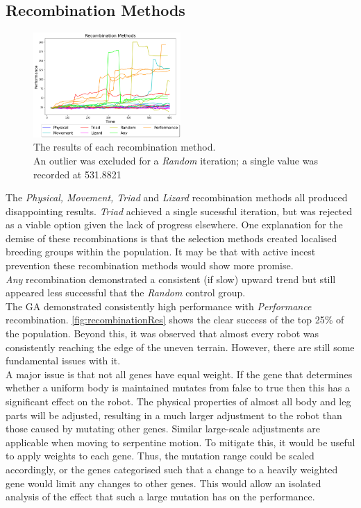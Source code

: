 \documentclass{article}
\begin{document}
\subsection{Recombination Methods}
\label{sec:Recombination Res}
\begin{figure}
    \centering
    \includegraphics[width=0.5\textwidth]{recombinationTypes}
    \caption{The results of each recombination method.\\ An outlier was excluded for a \textit{Random} iteration; a single value was recorded at 531.8821}
    \label{fig:recombinationRes}
\end{figure}
The \textit{Physical, Movement, Triad} and \textit{Lizard} recombination methods all produced disappointing results. \textit{Triad} achieved a single sucessful iteration, but was rejected as a viable option given the lack of progress elsewhere. One explanation for the demise of these recombinations is that the selection methods created localised breeding groups within the population. It may be that with active incest prevention  these recombination methods would show more promise.\\
\textit{Any} recombination demonstrated a consistent (if slow) upward trend but still appeared less successful that the \textit{Random} control group.\\
The GA demonstrated consistently high performance with \textit{Performance} recombination. \autoref{fig:recombinationRes} shows the clear success of the top 25\% of the population. Beyond this, it was observed that almost every robot was consistently reaching the edge of the uneven terrain. However, there are still some fundamental issues with it.\\

A major issue is that not all genes have equal weight. If the gene that determines whether a uniform body is maintained mutates from false to true then this has a significant effect on the robot. The physical properties of almost all body and leg parts will be adjusted, resulting in a much larger adjustment to the robot than those caused by mutating other genes. Similar large-scale adjustments are applicable when moving to serpentine motion. To mitigate this, it would be useful to apply weights to each gene. Thus, the mutation range could be scaled accordingly, or the genes categorised such that a change to a heavily weighted gene would limit any changes to other genes. This would allow an isolated analysis of the effect that such a large mutation has on the performance.\\
\end{document}

